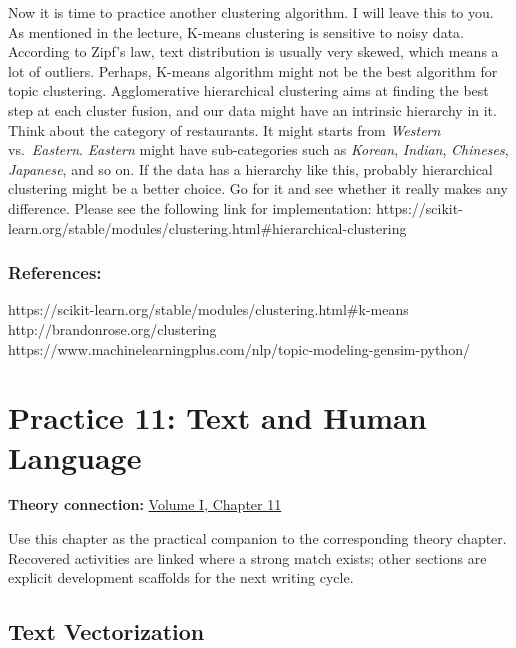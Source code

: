 \documentclass[
  letterpaper,
]{scrbook}
\begin{document}
Now it is time to practice another clustering algorithm. I will leave
this to you. As mentioned in the lecture, K-means clustering is
sensitive to noisy data. According to Zipf's law, text distribution is
usually very skewed, which means a lot of outliers. Perhaps, K-means
algorithm might not be the best algorithm for topic clustering.
Agglomerative hierarchical clustering aims at finding the best step at
each cluster fusion, and our data might have an intrinsic hierarchy in
it. Think about the category of restaurants. It might starts from
\emph{Western} vs.~\emph{Eastern}. \emph{Eastern} might have
sub-categories such as \emph{Korean}, \emph{Indian}, \emph{Chineses},
\emph{Japanese}, and so on. If the data has a hierarchy like this,
probably hierarchical clustering might be a better choice. Go for it and
see whether it really makes any difference. Please see the following
link for implementation:
https://scikit-learn.org/stable/modules/clustering.html\#hierarchical-clustering

\subsection*{References:}\label{references-4}

https://scikit-learn.org/stable/modules/clustering.html\#k-means
http://brandonrose.org/clustering
https://www.machinelearningplus.com/nlp/topic-modeling-gensim-python/

\chapter*{Practice 11: Text and Human Language}\label{ch-practice-11}


\textbf{Theory connection:} \hyperref[ch-text]{Volume I, Chapter 11}

Use this chapter as the practical companion to the corresponding theory
chapter. Recovered activities are linked where a strong match exists;
other sections are explicit development scaffolds for the next writing
cycle.

\section*{Text Vectorization}\label{sec-pr-11-text-vectorization}
\end{document}
